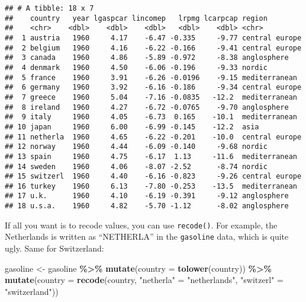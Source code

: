 \documentclass[
]{article}
\newenvironment{Shaded}{\begin{snugshade}}{\end{snugshade}}
\newcommand{\DataTypeTok}[1]{\textcolor[rgb]{0.13,0.29,0.53}{#1}}
\newcommand{\KeywordTok}[1]{\textcolor[rgb]{0.13,0.29,0.53}{\textbf{#1}}}
\newcommand{\NormalTok}[1]{#1}
\newcommand{\OperatorTok}[1]{\textcolor[rgb]{0.81,0.36,0.00}{\textbf{#1}}}
\newcommand{\StringTok}[1]{\textcolor[rgb]{0.31,0.60,0.02}{#1}}
\begin{document}
\begin{verbatim}
## # A tibble: 18 x 7
##    country   year lgaspcar lincomep   lrpmg lcarpcap region        
##    <chr>    <dbl>    <dbl>    <dbl>   <dbl>    <dbl> <chr>         
##  1 austria   1960     4.17    -6.47 -0.335     -9.77 central europe
##  2 belgium   1960     4.16    -6.22 -0.166     -9.41 central europe
##  3 canada    1960     4.86    -5.89 -0.972     -8.38 anglosphere   
##  4 denmark   1960     4.50    -6.06 -0.196     -9.33 nordic        
##  5 france    1960     3.91    -6.26 -0.0196    -9.15 mediterranean 
##  6 germany   1960     3.92    -6.16 -0.186     -9.34 central europe
##  7 greece    1960     5.04    -7.16 -0.0835   -12.2  mediterranean 
##  8 ireland   1960     4.27    -6.72 -0.0765    -9.70 anglosphere   
##  9 italy     1960     4.05    -6.73  0.165    -10.1  mediterranean 
## 10 japan     1960     6.00    -6.99 -0.145    -12.2  asia          
## 11 netherla  1960     4.65    -6.22 -0.201    -10.0  central europe
## 12 norway    1960     4.44    -6.09 -0.140     -9.68 nordic        
## 13 spain     1960     4.75    -6.17  1.13     -11.6  mediterranean 
## 14 sweden    1960     4.06    -8.07 -2.52      -8.74 nordic        
## 15 switzerl  1960     4.40    -6.16 -0.823     -9.26 central europe
## 16 turkey    1960     6.13    -7.80 -0.253    -13.5  mediterranean 
## 17 u.k.      1960     4.10    -6.19 -0.391     -9.12 anglosphere   
## 18 u.s.a.    1960     4.82    -5.70 -1.12      -8.02 anglosphere
\end{verbatim}

If all you want is to recode values, you can use \texttt{recode()}. For example, the Netherlands is
written as ``NETHERLA'' in the \texttt{gasoline} data, which is quite ugly. Same for Switzerland:

\begin{Shaded}
\begin{Highlighting}[]
\NormalTok{gasoline \textless{}{-}}\StringTok{ }\NormalTok{gasoline }\OperatorTok{\%\textgreater{}\%}
\StringTok{  }\KeywordTok{mutate}\NormalTok{(}\DataTypeTok{country =} \KeywordTok{tolower}\NormalTok{(country)) }\OperatorTok{\%\textgreater{}\%}
\StringTok{  }\KeywordTok{mutate}\NormalTok{(}\DataTypeTok{country =} \KeywordTok{recode}\NormalTok{(country, }\StringTok{"netherla"}\NormalTok{ =}\StringTok{ "netherlands"}\NormalTok{, }\StringTok{"switzerl"}\NormalTok{ =}\StringTok{ "switzerland"}\NormalTok{))}
\end{Highlighting}
\end{Shaded}
\end{document}
